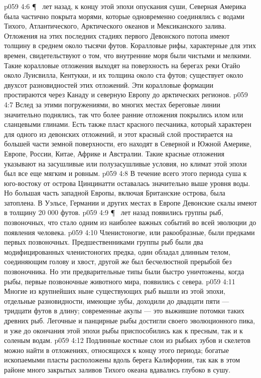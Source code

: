 \vs p059 4:6 \P\  лет назад, к концу этой эпохи опускания суши, Северная Америка была частично покрыта морями, которые одновременно соединялись с водами Тихого, Атлантического, Арктического океанов и Мексиканского залива. Отложения на этих последних стадиях первого Девонского потопа имеют толщину в среднем около тысячи футов. Коралловые рифы, характерные для этих времен, свидетельствуют о том, что внутренние моря были чистыми и мелкими. Такие коралловые отложения выходят на поверхность на берегах реки Огайо около Луисвилла, Кентукки, и их толщина около ста футов; существует около двухсот разновидностей этих отложений. Эти коралловые формации простираются через Канаду и северную Европу до арктических регионов.
\vs p059 4:7 Вслед за этими погружениями, во многих местах береговые линии значительно поднялись, так что более ранние отложения покрылись илом или сланцевыми глинами. Есть также пласт красного песчаника, который характерен для одного из девонских отложений, и этот красный слой простирается на большей части земной поверхности, его находят в Северной и Южной Америке, Европе, России, Китае, Африке и Австралии. Такие красные отложения указывают на засушливые или полузасушливые условия, но климат этой эпохи был все еще мягким и ровным.
\vs p059 4:8 В течение всего этого периода суша к юго\hyp{}востоку от острова Цинцинатти оставалась значительно выше уровня воды. Но большая часть западной Европы, включая Британские острова, была затоплена. В Уэльсе, Германии и других местах в Европе Девонские скалы имеют в толщину 20 000 футов.
\vs p059 4:9 \P\  лет назад появились группы рыб, позвоночных, что стало одним из наиболее важных событий во всей эволюции до появления человека.
\vs p059 4:10 Членистоногие, или ракообразные, были предками первых позвоночных. Предшественниками группы рыб были два модифицированных членистоногих предка, один обладал длинным телом, соединяющим голову и хвост, другой же был бесчелюстной прерыбой без позвоночника. Но эти предварительные типы были быстро уничтожены, когда рыбы, первые позвоночные животного мира,  появились с севера.
\vs p059 4:11 Многие из крупнейших ныне существующих рыб вышли из этой эпохи, отдельные разновидности, имеющие зубы, доходили до двадцати пяти --- тридцати футов в длину; современные акулы --- это выжившие потомки таких древних рыб. Легочные и панцирные рыбы достигли своего эволюционного пика, и уже до окончания этой эпохи рыбы приспособились как к пресным, так и к соленым водам.
\vs p059 4:12 Подлинные костные слои из рыбьих зубов и скелетов можно найти в отложениях, относящихся к концу этого периода; богатые ископаемыми пласты расположены вдоль берега Калифорнии, так как в этом районе много закрытых заливов Тихого океана вдавались глубоко в сушу.
